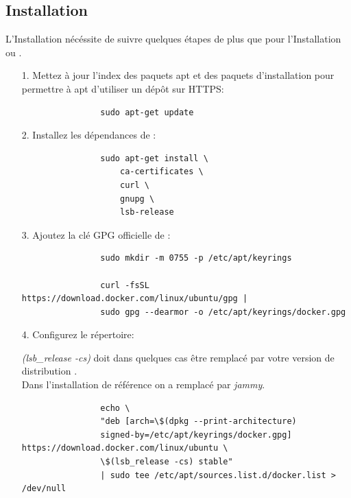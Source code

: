 \subsection[Installation Linux]{Installation \linux{}\label{sec:installation_linux}}

    L'Installation \linux{} nécéssite de suivre quelques étapes de plus que pour l'Installation \macos{} ou \windows{}.\\
    \begin{itemize}
    
        \item[1.] Mettez à jour l'index des paquets apt et des paquets d'installation pour permettre à apt d'utiliser un dépôt sur HTTPS:
        
            \begin{lstlisting}
                sudo apt-get update
            \end{lstlisting}

        \item[2.] Installez les dépendances de \docker{}:

            \begin{lstlisting}
                sudo apt-get install \
                    ca-certificates \
                    curl \
                    gnupg \
                    lsb-release
            \end{lstlisting}

        \item[3.] Ajoutez la clé GPG officielle de \docker{}:

            \begin{lstlisting}
                sudo mkdir -m 0755 -p /etc/apt/keyrings

                curl -fsSL https://download.docker.com/linux/ubuntu/gpg | 
                sudo gpg --dearmor -o /etc/apt/keyrings/docker.gpg
            \end{lstlisting}

        \item[4.] Configurez le répertoire:\\

            \begin{footnotesize}
                \textit{\textdollar(lsb\_release -cs)} doit dans quelques cas être remplacé par votre version de distribution \linux{}.\\
                Dans l'installation de référence on a remplacé par \textit{jammy}.
            \end{footnotesize}
            \begin{lstlisting}
                echo \
                "deb [arch=\$(dpkg --print-architecture) 
                signed-by=/etc/apt/keyrings/docker.gpg] https://download.docker.com/linux/ubuntu \
                \$(lsb_release -cs) stable" 
                | sudo tee /etc/apt/sources.list.d/docker.list > /dev/null
            \end{lstlisting}


\end{itemize}
